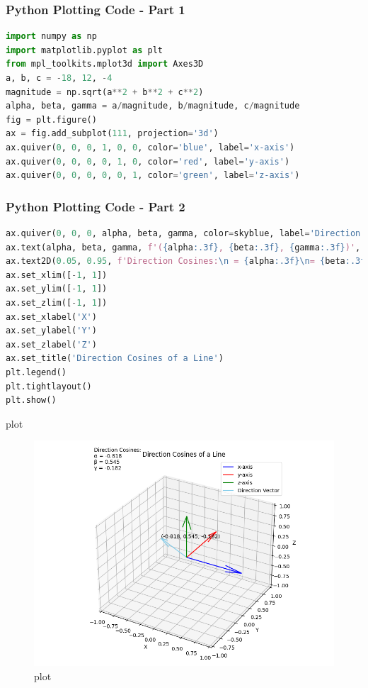 \documentclass{beamer}
\begin{document}
\begin{frame}[fragile]
\frametitle{\textbf{Python Plotting Code - Part 1}}
\begin{lstlisting}[language=Python]
import numpy as np
import matplotlib.pyplot as plt
from mpl_toolkits.mplot3d import Axes3D
a, b, c = -18, 12, -4
magnitude = np.sqrt(a**2 + b**2 + c**2)
alpha, beta, gamma = a/magnitude, b/magnitude, c/magnitude
fig = plt.figure()
ax = fig.add_subplot(111, projection='3d')
ax.quiver(0, 0, 0, 1, 0, 0, color='blue', label='x-axis')
ax.quiver(0, 0, 0, 0, 1, 0, color='red', label='y-axis')
ax.quiver(0, 0, 0, 0, 0, 1, color='green', label='z-axis')


\end{lstlisting}
\end{frame}


\begin{frame}[fragile]

\frametitle{\textbf{Python Plotting Code - Part 2}}
\begin{lstlisting}[language=Python]
ax.quiver(0, 0, 0, alpha, beta, gamma, color=skyblue, label='Direction Vector')
ax.text(alpha, beta, gamma, f'({alpha:.3f}, {beta:.3f}, {gamma:.3f})', fontsize=10)
ax.text2D(0.05, 0.95, f'Direction Cosines:\n = {alpha:.3f}\n= {beta:.3f}\n = {gamma:.3f}', transform=ax.transAxes)
ax.set_xlim([-1, 1])
ax.set_ylim([-1, 1])
ax.set_zlim([-1, 1])
ax.set_xlabel('X')
ax.set_ylabel('Y')
ax.set_zlabel('Z')
ax.set_title('Direction Cosines of a Line')
plt.legend()
plt.tightlayout()
plt.show()
\end{lstlisting}
\end{frame}
\begin{frame}{plot}
    \begin{figure}
        \centering
        \includegraphics[width=0.5\linewidth]{figs/plot.png}
        \caption{plot}
        \label{fig:placeholder}
    \end{figure}
\end{frame}
\end{document}
